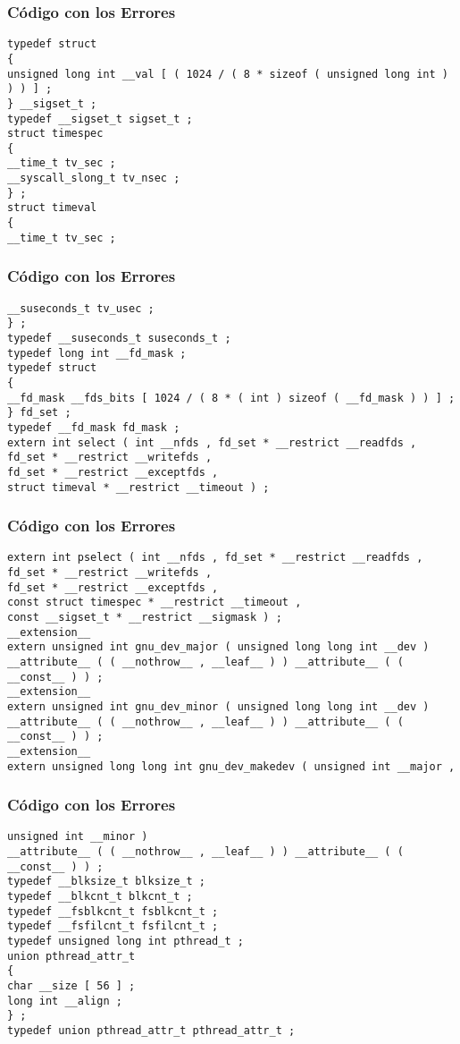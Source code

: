 \documentclass{beamer}
\begin{document}
\begin{frame}[fragile]
\frametitle{C\'odigo con los Errores}
\begin{verbatim}
typedef struct 
{ 
unsigned long int __val [ ( 1024 / ( 8 * sizeof ( unsigned long int ) ) ) ] ; 
} __sigset_t ; 
typedef __sigset_t sigset_t ; 
struct timespec 
{ 
__time_t tv_sec ; 
__syscall_slong_t tv_nsec ; 
} ; 
struct timeval 
{ 
__time_t tv_sec ; 
\end{verbatim}
\end{frame}
\begin{frame}[fragile]
\frametitle{C\'odigo con los Errores}
\begin{verbatim}
__suseconds_t tv_usec ; 
} ; 
typedef __suseconds_t suseconds_t ; 
typedef long int __fd_mask ; 
typedef struct 
{ 
__fd_mask __fds_bits [ 1024 / ( 8 * ( int ) sizeof ( __fd_mask ) ) ] ; 
} fd_set ; 
typedef __fd_mask fd_mask ; 
extern int select ( int __nfds , fd_set * __restrict __readfds , 
fd_set * __restrict __writefds , 
fd_set * __restrict __exceptfds , 
struct timeval * __restrict __timeout ) ; 
\end{verbatim}
\end{frame}
\begin{frame}[fragile]
\frametitle{C\'odigo con los Errores}
\begin{verbatim}
extern int pselect ( int __nfds , fd_set * __restrict __readfds , 
fd_set * __restrict __writefds , 
fd_set * __restrict __exceptfds , 
const struct timespec * __restrict __timeout , 
const __sigset_t * __restrict __sigmask ) ; 
__extension__ 
extern unsigned int gnu_dev_major ( unsigned long long int __dev ) 
__attribute__ ( ( __nothrow__ , __leaf__ ) ) __attribute__ ( ( __const__ ) ) ; 
__extension__ 
extern unsigned int gnu_dev_minor ( unsigned long long int __dev ) 
__attribute__ ( ( __nothrow__ , __leaf__ ) ) __attribute__ ( ( __const__ ) ) ; 
__extension__ 
extern unsigned long long int gnu_dev_makedev ( unsigned int __major , 
\end{verbatim}
\end{frame}
\begin{frame}[fragile]
\frametitle{C\'odigo con los Errores}
\begin{verbatim}
unsigned int __minor ) 
__attribute__ ( ( __nothrow__ , __leaf__ ) ) __attribute__ ( ( __const__ ) ) ; 
typedef __blksize_t blksize_t ; 
typedef __blkcnt_t blkcnt_t ; 
typedef __fsblkcnt_t fsblkcnt_t ; 
typedef __fsfilcnt_t fsfilcnt_t ; 
typedef unsigned long int pthread_t ; 
union pthread_attr_t 
{ 
char __size [ 56 ] ; 
long int __align ; 
} ; 
typedef union pthread_attr_t pthread_attr_t ; 
\end{verbatim}
\end{frame}
\end{document}
